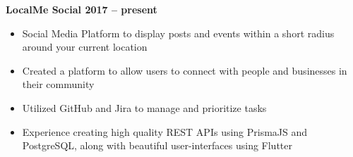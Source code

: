 \textbf{{LocalMe Social} \hfill 2017 -- present} \par
\begin{itemize}
	\item Social Media Platform to display posts and events within a short radius around your current location
    \item Created a platform to allow users to connect with people and businesses in their community
    \item Utilized GitHub and Jira to manage and prioritize tasks
    \item Experience creating high quality REST APIs using PrismaJS and PostgreSQL, along with beautiful user-interfaces using Flutter
\end{itemize}\vspace{0.1cm}\par
